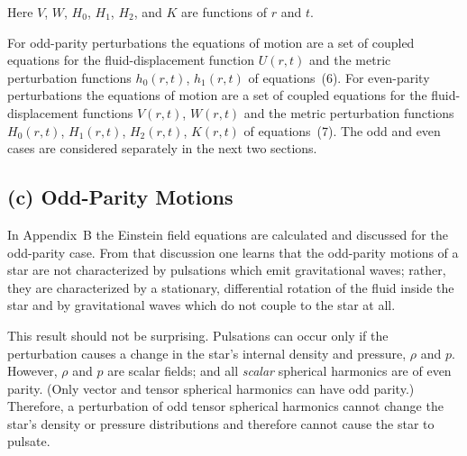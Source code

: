 Here $V$, $W$, $H_{0}$, $H_{1}$, $H_{2}$, and $K$ are functions of $r$ and $t$.

For odd-parity perturbations the equations of motion are a set of coupled equations for
the fluid-displacement function $U(r,t)$ and the metric perturbation functions $h_{0}(r,t)$,
$h_{1}(r,t)$ of equations~(6). For even-parity perturbations the equations of motion are a set
of coupled equations for the fluid-displacement functions $V(r,t)$, $W(r,t)$ and the metric
perturbation functions $H_{0}(r,t)$, $H_{1}(r,t)$, $H_{2}(r,t)$, $K(r,t)$ of equations~(7). The odd and even
cases are considered separately in the next two sections.

\subsection*{(c) Odd-Parity Motions}

In Appendix~B the Einstein field equations are calculated and discussed for the odd-parity
case. From that discussion one learns that the odd-parity motions of a star are not
characterized by pulsations which emit gravitational waves; rather, they are characterized
by a stationary, differential rotation of the fluid inside the star and by gravitational
waves which do not couple to the star at all.

This result should not be surprising. Pulsations can occur only if the perturbation
causes a change in the star's internal density and pressure, $\rho$ and $p$. However, $\rho$ and $p$
are scalar fields; and all \textit{scalar} spherical harmonics are of even parity. (Only vector and
tensor spherical harmonics can have odd parity.) Therefore, a perturbation of odd
tensor spherical harmonics cannot change the star's density or pressure distributions and therefore cannot
cause the star to pulsate.
